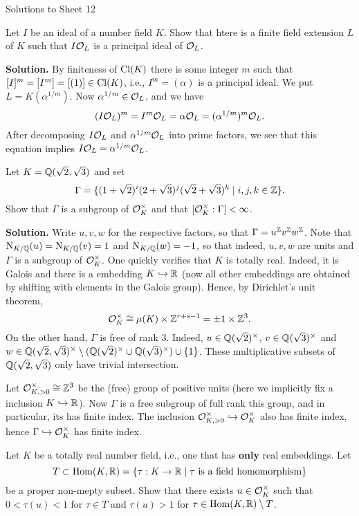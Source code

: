 \documentclass[a4paper,11pt]{article}
\begin{document}
\begin{center}
    \huge{Solutions to Sheet 12}
\end{center}

Let $I$ be an ideal of a number field $K$. Show that htere is a finite field extension $L$ of $K$ such that 
$I \mathcal{O}_L$ is a principal ideal of $\mathcal{O}_L$.

\textbf{Solution.}
By finiteness of $\operatorname{Cl}(K)$ there is some integer $m$ such that $[I]^m = [I^m] = [(1)] \in \operatorname{Cl}(K)$,
i.e., $I^m = (\alpha)$ is a principal ideal. We put $L = K(\alpha^{1/m})$. Now 
$\alpha^{1/m} \in \mathcal{O}_L$, and we have 
$$(I \mathcal{O}_L)^m = I^m \mathcal{O}_L = \alpha \mathcal{O}_L = (\alpha^{1/m})^m \mathcal{O}_L.$$
After decomposing $I\mathcal{O}_L$ and $\alpha^{1/m}\mathcal{O}_L$ into prime factors, we see that 
this equation implies $I\mathcal{O}_L = \alpha^{1/m} \mathcal{O}_L$. 

Let $K = \mathbb{Q}(\sqrt 2, \sqrt 3)$ and set 
\begin{equation*}
    \Gamma = \{(1+ \sqrt 2)^i(2 + \sqrt 3)^j(\sqrt 2 + \sqrt 3)^k \mid i,j,k \in \mathbb{Z}\}.
\end{equation*}
Show that $\Gamma$ is a subgroup of $\mathcal{O}_K^\times$ and that $[\mathcal{O}_K^\times: \Gamma] < \infty$.

\textbf{Solution.}
Write $u,v,w$ for the respective factors, so that $\Gamma = u^{\mathbb{Z}} v^{\mathbb{Z}} w^{\mathbb{Z}}$. 
Note that $\operatorname{N}_{K/\mathbb{Q}}(u) = \operatorname{N}_{K/\mathbb{Q}}(v) = 1$ and $\operatorname{N}_{K/\mathbb{Q}}(w) = -1$, so that indeed,
$u,v,w$ are units and $\Gamma$ is a subgroup of $\mathcal{O}_K^\times$. One quickly verifies that
$K$ is totally real. Indeed, it is Galois and there is a embedding $K \hookrightarrow \mathbb{R}$ (now all
other embeddings are obtained by shifting with elements in the Galois group). 
Hence, by Dirichlet's unit theorem, 
$$\mathcal{O}_K^\times \cong \mu(K) \times \mathbb{Z}^{r+s-1} = \pm 1 \times \mathbb{Z}^3.$$
On the other hand, $\Gamma$ is free of rank $3$. Indeed, $u \in \mathbb{Q}(\sqrt 2)^\times$,
$v \in \mathbb{Q}(\sqrt 3)^\times$ and $w \in \mathbb{Q}(\sqrt 2, \sqrt
3)^\times\setminus(\mathbb{Q}(\sqrt 2)^\times \cup \mathbb{Q}(\sqrt 3)^\times) \cup \{1\}$. These multiplicative
subsets of $\mathbb{Q}(\sqrt 2, \sqrt 3)$ only have trivial intersection.

Let $\mathcal{O}_{K, >0}^\times \cong \mathbb{Z}^3$ be the (free) group of positive units (here we implicitly
fix a inclusion $K \hookrightarrow \mathbb{R}$). 
Now $\Gamma$ is a free subgroup of full rank this group, and in particular, 
its has finite index. The inclusion $\mathcal{O}_{K, >0}^\times \hookrightarrow \mathcal{O}_K^\times$ also has
finite index, hence $\Gamma \hookrightarrow \mathcal{O}_K^\times$ has finite index. 

Let $K$ be a totally real number field, i.e., one that has \textbf{only} real embeddings.
Let 
\begin{equation*}
    T \subset \operatorname{Hom}(K, \mathbb{R}) = \{\tau: K \to \mathbb{R} \mid \tau \text { is a field homomorphism}\}
\end{equation*}
be a proper non-mepty subset. Show that there exists $u \in \mathcal{O}_K^\times$ such that 
$0 < \tau(u) < 1$ for $\tau \in T$ and $\tau(u) > 1$ for $\tau \in \operatorname{Hom}(K, \mathbb{R})
\setminus T$.
\end{document}
